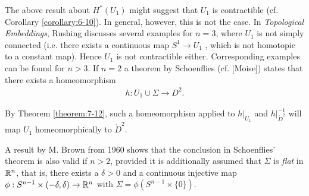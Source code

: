 \begin{remark}\label{remark:7-17}
  The above result about $H^*(U_1)$ might suggest that $U_1$ is contractible
  (cf. Corollary \ref{corollary:6-10}). In general, however, this is not the case. 
  In \textit{Topological Embeddings}, Rushing discusses several examples for $n = 3$, where 
  $U_1$ is not simply connected (i.e. there exists a continuous map $S^1\to U_1$ , which is not
  homotopic to a constant map). Hence $U_1$ is not contractible either. Corresponding
  examples can be found for $n > 3$. If $n = 2$ a theorem by Schoenflies (cf. [Moise]) states that 
  there exists a homeomorphism
  \begin{align*}
    h:U_1\cup \Sigma\to D^2.
  \end{align*}

  By Theorem \ref{theorem:7-12}, such a homeomorphism applied to $h|_{U_1}$ and $h|_{\mathring{D}^2}^{-1}$
  will map $U_1$ homeomorphically to $\mathring{D}^2$.
\end{remark}

A result by M. Brown from 1960 shows that the conclusion in Schoenflies' theorem
is also valid if $n > 2$, provided it is additionally assumed that $\Sigma$ is \textit{flat} 
in ${\mathbb{R}}^n$, that is, there exists a $\delta>0$ and a continuous injective map $\phi:S^{n-1}\times(-\delta, \delta)\to{\ensuremath{\mathbb{R}}}^n$
with $\Sigma=\phi(S^{n-1}\times\{0\})$.

